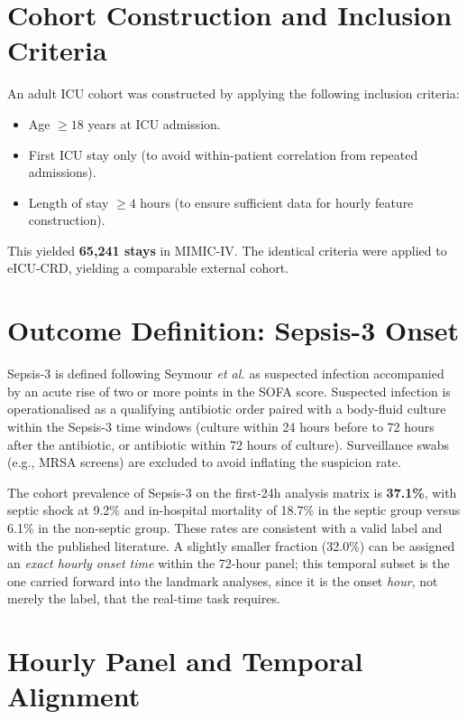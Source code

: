 \section{Cohort Construction and Inclusion Criteria}
An adult ICU cohort was constructed by applying the following inclusion
criteria:
\begin{itemize}
  \item Age $\ge 18$ years at ICU admission.
  \item First ICU stay only (to avoid within-patient correlation from repeated
  admissions).
  \item Length of stay $\ge 4$ hours (to ensure sufficient data for hourly
  feature construction).
\end{itemize}

This yielded \textbf{65{,}241 stays} in MIMIC-IV. The identical criteria were
applied to eICU-CRD, yielding a comparable external cohort.

\section{Outcome Definition: Sepsis-3 Onset}
\label{sec:outcome}

Sepsis-3 is defined following Seymour \emph{et al.} \cite{seymour2016criteria}
as suspected infection accompanied by an acute rise of two or more points in
the SOFA score. Suspected infection is operationalised as a qualifying
antibiotic order paired with a body-fluid culture within the Sepsis-3 time
windows (culture within 24 hours before to 72 hours after the antibiotic, or
antibiotic within 72 hours of culture). Surveillance swabs (e.g., MRSA screens)
are excluded to avoid inflating the suspicion rate.

The cohort prevalence of Sepsis-3 on the first-24h analysis matrix is
\textbf{37.1\%}, with septic shock at 9.2\% and in-hospital mortality of 18.7\%
in the septic group versus 6.1\% in the non-septic group. These rates are
consistent with a valid label and with the published literature. A slightly
smaller fraction (32.0\%) can be assigned an \emph{exact hourly onset time}
within the 72-hour panel; this temporal subset is the one carried forward into
the landmark analyses, since it is the onset \emph{hour}, not merely the label,
that the real-time task requires.

\section{Hourly Panel and Temporal Alignment}
\label{sec:panel}

